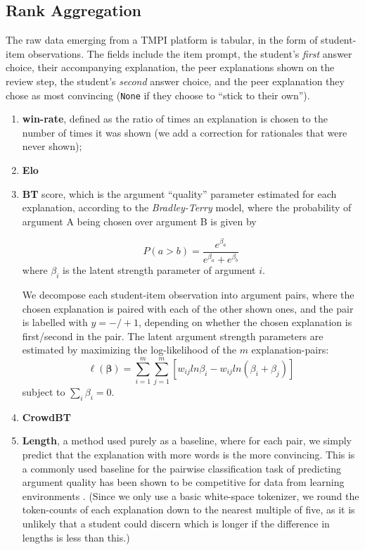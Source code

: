 \documentclass[sigconf]{acmart}
\begin{document}
\subsection{Rank Aggregation}
The raw data emerging from a TMPI platform is tabular, in the form of 
student-item observations.
The fields include the item prompt, the student's \textit{first} answer choice, 
their accompanying explanation, the peer explanations shown on the review step, 
the student's \textit{second} answer choice, and the peer explanation they 
chose as most convincing (\verb|None| if they choose to ``stick to their own'').

\begin{enumerate}

	\item \textbf{win-rate}, defined as the ratio of times an explanation is 
	chosen to the number of times it was shown (we add a correction for 
	rationales that were never shown); 

	\item \textbf{Elo}

	\item \textbf{BT} score, which is the argument ``quality'' parameter 
	estimated for each explanation, according to the \textit{Bradley-Terry} 
	model, where the probability of argument A being chosen over argument B is 
	given by 

	$$
	P(a>b) = 
	\frac{e^{\beta_a}}{e^{\beta_a}+e^{\beta_b}}
	$$
	where $\beta_i$ is the latent strength parameter of argument $i$. 
	
	We decompose each student-item observation into argument pairs, where the 
	chosen explanation is paired with each of the other shown ones, and the 
	pair is labelled with $y=-/+1$, depending on whether the chosen explanation 
	is first/second in the pair.   
	The latent argument strength parameters are estimated by maximizing the 
	log-likelihood of the $m$ explanation-pairs:
	$$
	\ell(\boldsymbol{\beta})=\sum_{i=1}^{m}\sum_{j=1}^{m} 
	[w_{ij}ln\beta_i-w_{ij}ln(\beta_i+\beta_j)]
	$$
	subject to $\sum_{i}\beta_i=0$.
	
	\item \textbf{CrowdBT}\cite{chen_pairwise_2013}

	\item \textbf{Length}, a method used purely as a baseline, where for each 
	pair, we simply predict that the explanation with more words is the more 
	convincing.
	This is a commonly used baseline  for the pairwise classification task of 
	predicting argument quality \cite{toledo_automatic_2019} has been shown to 
	be competitive for data from learning environments 
	\cite{bhatnagar_learnersourcing_2020}.
	(Since we only use a basic white-space tokenizer, we round the token-counts 
	of each explanation down to the nearest multiple of five, as it is unlikely 
	that a student could discern which is longer if the difference in lengths 
	is less than this.)
\end{enumerate}
\end{document}
